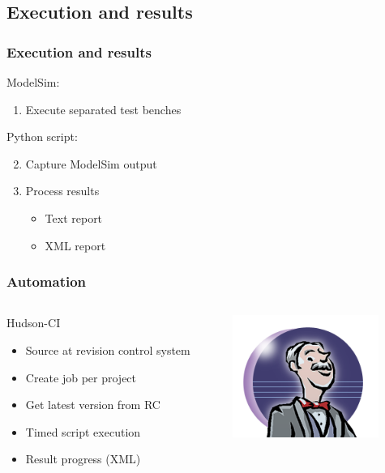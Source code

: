 \documentclass[british,10pt]{beamer}
\begin{document}
\subsection{Execution and results}
\begin{frame}\frametitle{Execution and results}
ModelSim:
\begin{enumerate}
\item Execute separated test benches
\end{enumerate}
Python script:
\begin{enumerate}
\setcounter{enumi}{1}
\item Capture ModelSim output
\item Process results
\begin{itemize}
\item Text report
\item XML report
\end{itemize}
\end{enumerate}
\end{frame}

\begin{frame}\frametitle{Automation}
\begin{columns}
\begin{column}{0.6\textwidth}
Hudson-CI
\begin{itemize}
\item Source at revision control system
\item Create job per project
\item Get latest version from RC
\item Timed script execution
\item Result progress (XML)
\end{itemize}
\end{column}
\includegraphics[width=0.8\textwidth]{images/hudson.png}
\end{columns}
\end{frame}
\end{document}
